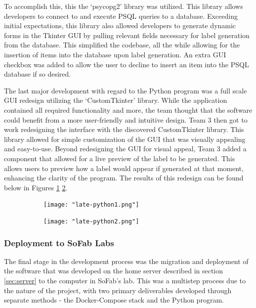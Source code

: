\documentclass{article}
\begin{document}
To accomplish this, this the `psycopg2' library was utilized. This library allows developers to connect to and execute PSQL queries to a 
database. Exceeding initial expectations, this library also allowed developers to generate dynamic forms in the Tkinter GUI by pulling
relevant fields necessary for label generation from the database. This simplified the codebase, all the while allowing for the insertion
of items into the database upon label generation. An extra GUI checkbox was added to allow the user to decline to insert an item into 
the PSQL database if so desired.

The last major development with regard to the Python program was a full scale GUI redesign utilizing the `CustomTkinter' library. While
the application contained all required functionality and more, the team thought that the software could benefit from a more 
user-friendly and intuitive design. Team 3 then got to work redesigning the interface with the discovered CustomTkinter library. This 
library allowed for simple customization of the GUI that was visually appealing and easy-to-use. Beyond redesigning the GUI for 
visual appeal, Team 3 added a component that allowed for a live preview of the label to be generated. This allows users to 
preview how a label would appear if generated at that moment, enhancing the clarity of the program. The results of this redesign can 
be found below in Figures \ref{fig:late-python1} \ref{fig:late-python2}.

\begin{figure}[h!]
    \centering
    \begin{subfigure}[b]{\textwidth}
        \centering
        \texttt{[image: "late-python1.png"]}
        \caption{}
        \label{fig:late-python1}
    \end{subfigure}
    \begin{subfigure}[b]{\textwidth}
        \centering
        \texttt{[image: "late-python2.png"]}
        \caption{}
        \label{fig:late-python2}
    \end{subfigure}
    \caption{}
    \label{fig:late-python}
\end{figure}
\FloatBarrier

\subsubsection{Deployment to SoFab Labs}
The final stage in the development process was the migration and deployment of the software that was developed on the home server 
described in section \ref{sec:server} to the computer in SoFab's lab. This was a multistep process due to the nature of the project, 
with two primary deliverables developed through separate methods - the Docker-Compose stack and the Python program. 
\end{document}

